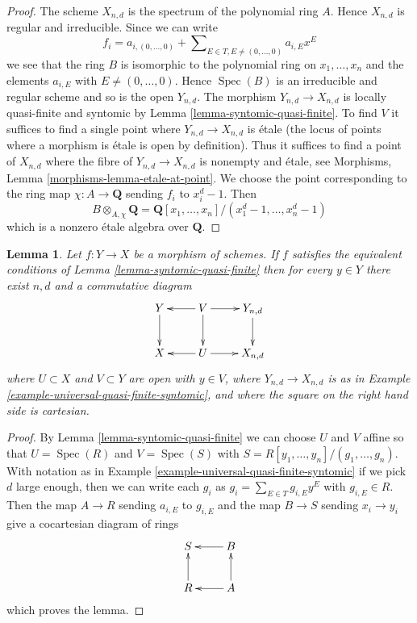 \documentclass{stacks-project}
\theoremstyle{plain}
\newtheorem{lemma}[subsection]{Lemma}
\theoremstyle{definition}
\theoremstyle{remark}
\numberwithin{equation}{subsection}
\def\Spec{\mathop{\mathrm{Spec}}}
\begin{document}
\begin{proof}
The scheme $X_{n, d}$ is the spectrum of the polynomial ring $A$.
Hence $X_{n, d}$ is regular and irreducible. Since we can write
$$
f_i = a_{i, (0, \ldots, 0)} +
\sum\nolimits_{E \in T, E \not = (0, \ldots, 0)} a_{i, E} x^E
$$
we see that the ring $B$ is isomorphic to the polynomial ring
on $x_1, \ldots, x_n$ and the elements $a_{i, E}$ with
$E \not = (0, \ldots, 0)$. Hence $\Spec(B)$ is an irreducible and
regular scheme and so is the open $Y_{n, d}$. The morphism
$Y_{n, d} \to X_{n, d}$ is locally quasi-finite and syntomic by
Lemma \ref{lemma-syntomic-quasi-finite}. To find $V$ it suffices
to find a single point where $Y_{n, d} \to X_{n, d}$ is \'etale
(the locus of points where a morphism is \'etale is open by
definition). Thus it suffices to find a point of $X_{n, d}$
where the fibre of $Y_{n, d} \to X_{n, d}$ is nonempty and \'etale, see
Morphisms, Lemma \ref{morphisms-lemma-etale-at-point}. We choose
the point corresponding to the ring map $\chi : A \to \mathbf{Q}$
sending $f_i$ to $x_i^d - 1$. Then
$$
B \otimes_{A, \chi} \mathbf{Q} =
\mathbf{Q}[x_1, \ldots, x_n]/(x_1^d - 1, \ldots, x_n^d - 1)
$$
which is a nonzero \'etale algebra over $\mathbf{Q}$.
\end{proof}

\begin{lemma}
\label{lemma-locally-comes-from-universal}
Let $f : Y \to X$ be a morphism of schemes. If $f$ satisfies the equivalent
conditions of Lemma \ref{lemma-syntomic-quasi-finite} then for every
$y \in Y$ there exist $n, d$ and a commutative diagram
$$
\xymatrix{
Y \ar[d] &
V \ar[d] \ar[l] \ar[r] &
Y_{n, d} \ar[d] \\
X & U \ar[l] \ar[r] &
X_{n, d}
}
$$
where $U \subset X$ and $V \subset Y$ are open with $y \in V$,
where $Y_{n, d} \to X_{n, d}$
is as in Example \ref{example-universal-quasi-finite-syntomic}, and
where the square on the right hand side is cartesian.
\end{lemma}

\begin{proof}
By Lemma \ref{lemma-syntomic-quasi-finite}
we can choose $U$ and $V$ affine so that
$U = \Spec(R)$ and $V = \Spec(S)$ with
$S = R[y_1, \ldots, y_n]/(g_1, \ldots, g_n)$.
With notation as in Example \ref{example-universal-quasi-finite-syntomic}
if we pick $d$ large enough, then we can write each $g_i$ as
$g_i = \sum_{E \in T} g_{i, E}y^E$ with $g_{i, E} \in R$.
Then the map $A \to R$ sending $a_{i, E}$ to $g_{i, E}$
and the map $B \to S$ sending $x_i \to y_i$ give a cocartesian
diagram of rings
$$
\xymatrix{
S & B \ar[l] \\
R \ar[u] & A \ar[l] \ar[u]
}
$$
which proves the lemma.
\end{proof}
\end{document}
